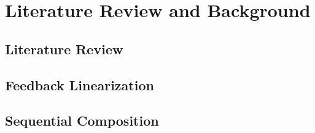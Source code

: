 \chapter{Literature Review and Background}
\label{chapter:background}

\section{Literature Review}
\label{section:literature}
\lipsum

\section{Feedback Linearization}
\label{section:feedback-linearization}
\lipsum

\section{Sequential Composition}
\label{section:sequential-composition}
\lipsum
